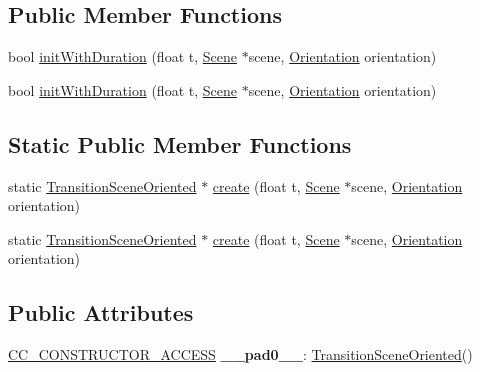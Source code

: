 \subsection*{Public Member Functions}
\begin{DoxyCompactItemize}
\item 
bool \hyperlink{classTransitionSceneOriented_ad20e3d07c7fb9f7717fe76301927a24b}{init\+With\+Duration} (float t, \hyperlink{classScene}{Scene} $\ast$scene, \hyperlink{classTransitionScene_a0b2b247806fb10a20de0cbc554210c4d}{Orientation} orientation)
\item 
bool \hyperlink{classTransitionSceneOriented_ad20e3d07c7fb9f7717fe76301927a24b}{init\+With\+Duration} (float t, \hyperlink{classScene}{Scene} $\ast$scene, \hyperlink{classTransitionScene_a0b2b247806fb10a20de0cbc554210c4d}{Orientation} orientation)
\end{DoxyCompactItemize}
\subsection*{Static Public Member Functions}
\begin{DoxyCompactItemize}
\item 
static \hyperlink{classTransitionSceneOriented}{Transition\+Scene\+Oriented} $\ast$ \hyperlink{classTransitionSceneOriented_a800e9cc8447860aeff0f9b9d198f4f29}{create} (float t, \hyperlink{classScene}{Scene} $\ast$scene, \hyperlink{classTransitionScene_a0b2b247806fb10a20de0cbc554210c4d}{Orientation} orientation)
\item 
static \hyperlink{classTransitionSceneOriented}{Transition\+Scene\+Oriented} $\ast$ \hyperlink{classTransitionSceneOriented_a6675d1be07ee91ed34025bf67290408e}{create} (float t, \hyperlink{classScene}{Scene} $\ast$scene, \hyperlink{classTransitionScene_a0b2b247806fb10a20de0cbc554210c4d}{Orientation} orientation)
\end{DoxyCompactItemize}
\subsection*{Public Attributes}
\begin{DoxyCompactItemize}
\item 
\mbox{\label{classTransitionSceneOriented_ad71839e11bba12fdaf1b65331513cb07}} 
\hyperlink{_2cocos2d_2cocos_2base_2ccConfig_8h_a25ef1314f97c35a2ed3d029b0ead6da0}{C\+C\+\_\+\+C\+O\+N\+S\+T\+R\+U\+C\+T\+O\+R\+\_\+\+A\+C\+C\+E\+SS} {\bfseries \+\_\+\+\_\+pad0\+\_\+\+\_\+}\+: \hyperlink{classTransitionSceneOriented}{Transition\+Scene\+Oriented}()
\end{DoxyCompactItemize}
